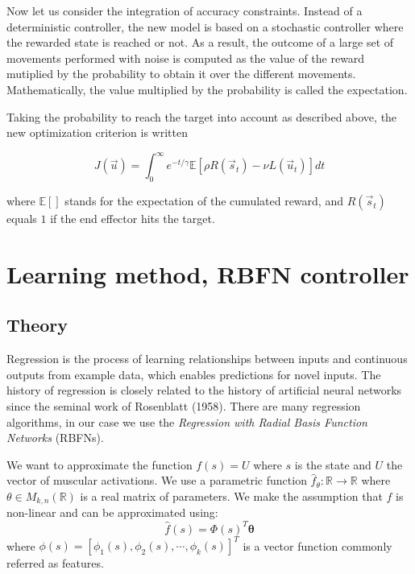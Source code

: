 \documentclass[pdftex,a4paper,11pt]{report}
\begin{document}
Now let us consider the integration of accuracy constraints. Instead of a deterministic controller, the new model is based on a stochastic controller where the rewarded state is reached or not. As a result, the outcome of a large set of movements performed with noise is computed as the value of the reward mutiplied by the probability to obtain it over the different movements. 
Mathematically, the value multiplied by the probability is called the expectation.

Taking the probability to reach the target into account as described above, the new optimization criterion is written

\begin{equation}
\label{eq:expectation}
 J(\vec{u}) = \int_0^{\infty} e^{-t/\gamma} \mathbb{E}[ \rho R(\vec{s}_t) - \nu L(\vec{u}_t) ] dt
\end{equation}

where $\mathbb{E}[]$ stands for the expectation of the cumulated reward, and $R(\vec{s}_t)$  equals $1$ if the end effector hits the target.

\section{Learning method, RBFN controller}
\label{sec_rbfn}

\subsection{Theory}

Regression is the process of learning relationships between inputs and continuous outputs from example data, which enables predictions for novel inputs.
The history of regression is closely related to the history of artificial neural networks since the seminal work of Rosenblatt (1958).
There are many regression algorithms, in our case we use the \textit{Regression with Radial Basis Function Networks} (RBFNs).

We want to approximate the function $f(s) = U$ where $s$ is the state and $U$ the vector of muscular activations.
We use a parametric function $\hat{f}_\theta: \mathbb{R} \rightarrow \mathbb{R}$ where $\theta \in M_{k,n}(\mathbb{R})$ is a real matrix of parameters. We make the assumption that $f$ is non-linear and can be approximated using:
\begin{equation}
	\hat{f}(s) = \Phi(s)^T\boldsymbol{\theta}
\end{equation}
where  
$\phi(s) = [\phi_1(s), \phi_2(s), \cdots, \phi_k(s)]^T$
is a vector function commonly referred as features.
\end{document}
